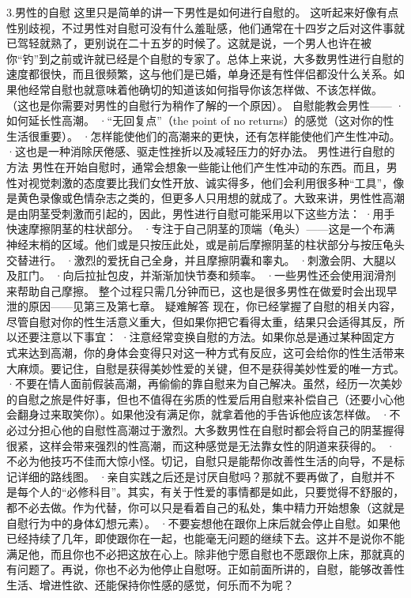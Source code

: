 \documentclass[12pt,UTF8,openany]{ctexbook}
\begin{document}
3.男性的自慰
这里只是简单的讲一下男性是如何进行自慰的。
这听起来好像有点性别歧视，不过男性对自慰可没有什么羞耻感，他们通常在十四岁之后对这件事就已驾轻就熟了，更别说在二十五岁的时候了。这就是说，一个男人也许在被你“钓”到之前或许就已经是个自慰的专家了。总体上来说，大多数男性进行自慰的速度都很快，而且很频繁，这与他们是已婚，单身还是有性伴侣都没什么关系。如果他经常自慰也就意味着他确切的知道该如何指导你该怎样做、不该怎样做。
（这也是你需要对男性的自慰行为稍作了解的一个原因）。
自慰能教会男性——
·如何延长性高潮。
·“无回复点”（the point of no returns）的感觉（这对你的性生活很重要）。
·怎样能使他们的高潮来的更快，还有怎样能使他们产生性冲动。
·这也是一种消除厌倦感、驱走性挫折以及减轻压力的好办法。
男性进行自慰的方法
男性在开始自慰时，通常会想象一些能让他们产生性冲动的东西。而且，男性对视觉刺激的态度要比我们女性开放、诚实得多，他们会利用很多种“工具”，像是黄色录像或色情杂志之类的，但更多人只用想的就成了。大致来讲，男性性高潮是由阴茎受刺激而引起的，因此，男性进行自慰可能采用以下这些方法：
·用手快速摩擦阴茎的柱状部分。
·专注于自己阴茎的顶端（龟头）——这是一个布满神经末梢的区域。他们或是只按压此处，或是前后摩擦阴茎的柱状部分与按压龟头交替进行。
·激烈的爱抚自己全身，并且摩擦阴囊和睾丸。
·刺激会阴、大腿以及肛门。
·向后拉扯包皮，并渐渐加快节奏和频率。
·一些男性还会使用润滑剂来帮助自己摩擦。
整个过程只需几分钟而已，这也是很多男性在做爱时会出现早泄的原因——见第三及第七章。
疑难解答
现在，你已经掌握了自慰的相关内容，尽管自慰对你的性生活意义重大，但如果你把它看得太重，结果只会适得其反，所以还要注意以下事宜：
·注意经常变换自慰的方法。如果你总是通过某种固定方式来达到高潮，你的身体会变得只对这一种方式有反应，这可会给你的性生活带来大麻烦。要记住，自慰是获得美妙性爱的关键，但不是获得美妙性爱的唯一方式。
·不要在情人面前假装高潮，再偷偷的靠自慰来为自己解决。虽然，经历一次美妙的自慰之旅是件好事，但也不值得在劣质的性爱后用自慰来补偿自己（还要小心他会翻身过来取笑你）。如果他没有满足你，就拿着他的手告诉他应该怎样做。
·不必过分担心他的自慰性高潮过于激烈。大多数男性在自慰时都会将自己的阴茎握得很紧，这样会带来强烈的性高潮，而这种感觉是无法靠女性的阴道来获得的。
·不必为他技巧不佳而大惊小怪。切记，自慰只是能帮你改善性生活的向导，不是标记详细的路线图。
·亲自实践之后还是讨厌自慰吗？那就不要再做了，自慰并不是每个人的“必修科目”。其实，有关于性爱的事情都是如此，只要觉得不舒服的，都不必去做。作为代替，你可以只是看着自己的私处，集中精力开始想象（这就是自慰行为中的身体幻想元素）。
·不要妄想他在跟你上床后就会停止自慰。如果他已经持续了几年，即使跟你在一起，也能毫无问题的继续下去。这并不是说你不能满足他，而且你也不必把这放在心上。除非他宁愿自慰也不愿跟你上床，那就真的有问题了。再说，你也不必为他停止自慰呀。正如前面所讲的，自慰，能够改善性生活、增进性欲、还能保持你性感的感觉，何乐而不为呢？
\end{document}
